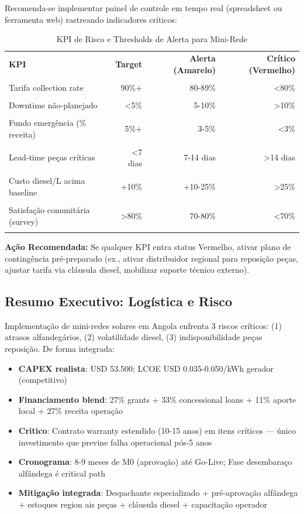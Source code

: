 \documentclass[12pt, a4paper]{article}
\begin{document}
Recomenda-se implementar painel de controle em tempo real (spreadsheet ou ferramenta web) rastreando indicadores críticos:\

\begin{table}[H]
\centering
\caption{KPI de Risco e Thresholds de Alerta para Mini-Rede}
\label{tab:kpi}
\small
\begin{tabular}{|l|r|r|r|}
\hline\textbf{KPI} &\textbf{Target} &\textbf{Alerta (Amarelo)} &\textbf{Crítico (Vermelho)} \\\\
\hline
Tarifa collection rate & 90\%+ & 80-89\% & <80\% \\\\
Downtime não-planejado & <5\% & 5-10\% & >10\% \\\\
Fundo emergência (\% receita) & 5\%+ & 3-5\% & <3\% \\\\
Lead-time peças críticas & <7 dias & 7-14 dias & >14 dias \\\\
Custo diesel/L acima baseline & +10\% & +10-25\% & >25\% \\\\
Satisfação comunitária (survey) & >80\% & 70-80\% & <70\% \\\\
\hline
\end{tabular}
\end{table}\textbf{Ação Recomendada:} Se qualquer KPI entra status Vermelho, ativar plano de contingência pré-preparado (ex., ativar distribuidor regional para reposição peças, ajustar tarifa via cláusula diesel, mobilizar suporte técnico externo).

\subsection{Resumo Executivo: Logística e Risco}

Implementação de mini-redes solares em Angola enfrenta 3 riscos críticos: (1) atrasos alfandegários, (2) volatilidade diesel, (3) indisponibilidade peças reposição. De forma integrada:
\begin{itemize}
\item\textbf{CAPEX realista}: USD 53.500; LCOE USD 0.035-0.050/kWh gerador (competitivo)\

\item\textbf{Financiamento blend}: 27\% grants + 33\% concessional loans + 11\% aporte local + 27\% receita operação\

\item\textbf{Critico}: Contrato warranty estendido (10-15 anos) em itens críticos — único investimento que previne falha operacional pós-5 anos\

\item\textbf{Cronograma}: 8-9 meses de M0 (aprovação) até Go-Live; Fase desembaraço alfândega é critical path\

\item\textbf{Mitigação integrada}: Despachante especializado + pré-aprovação alfândega + estoques region ais peças + cláusula diesel + capacitação operador\
\end{itemize}
\end{document}
